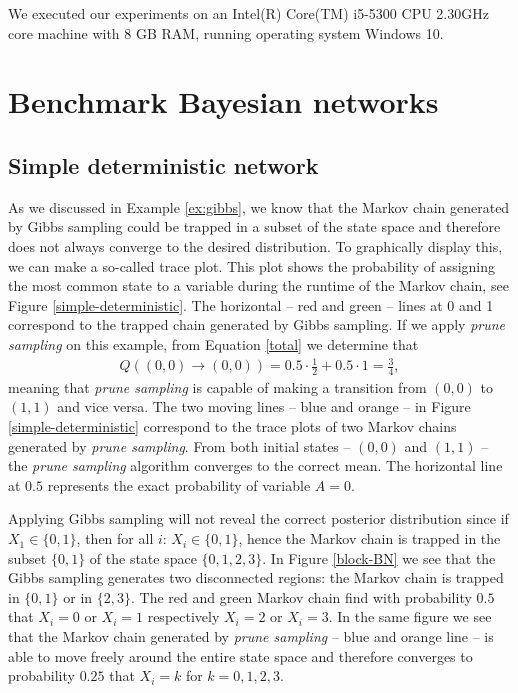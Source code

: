 \documentclass[a4paper, twoside, 11pt]{report}
\theoremstyle{plain}
\theoremstyle{definition}
\theoremstyle{remark}
\begin{document}
\indent We executed our experiments on an Intel(R) Core(TM) i5-5300 CPU \@ 2.30GHz core machine with 8 GB RAM, running operating system Windows 10. 

\section{Benchmark Bayesian networks}

\subsection{Simple deterministic network}
As we discussed in Example \ref{ex:gibbs}, we know that the Markov chain generated by Gibbs sampling could be trapped in a subset of the state space and therefore does not always converge to the desired distribution. To graphically display this, we can make a so-called trace plot. This plot shows the probability of assigning the most common state to a variable during the runtime of the Markov chain, see Figure \ref{simple-deterministic}. The horizontal -- red and green -- lines at 0 and 1 correspond to the trapped chain generated by Gibbs sampling. If we apply \textit{prune sampling} on this example, from Equation \ref{total} we determine that
\begin{align*}
Q((0,0) \to (0,0)) = 0.5 \cdot \frac{1}{2} + 0.5 \cdot 1 = \frac{3}{4},
\end{align*}
meaning that \textit{prune sampling} is capable of making a transition from $(0,0)$ to $(1,1)$ and vice versa. The two moving lines -- blue and orange -- in Figure \ref{simple-deterministic} correspond to the trace plots of two Markov chains generated by \textit{prune sampling}. From both initial states -- $(0,0)$ and $(1,1)$ -- the \textit{prune sampling} algorithm converges to the correct mean. The horizontal line at $0.5$ represents the exact probability of variable $A=0$. 

Applying Gibbs sampling will not reveal the correct posterior distribution since if $X_1 \in \{0, 1\}$, then for all $i$: $X_i \in \{0, 1\}$, hence the Markov chain is trapped in the subset $\{0,1\}$ of the state space $\{0,1,2,3\}$. In Figure \ref{block-BN} we see that the Gibbs sampling generates two disconnected regions: the Markov chain is trapped in $\{0, 1\}$ or in $\{2,3\}$. The red and green Markov chain find with probability $0.5$ that $X_i = 0$ or $X_i = 1$ respectively $X_i = 2$ or $X_i = 3$. In the same figure we see that the Markov chain generated by \textit{prune sampling} -- blue and orange line -- is able to move freely around the entire state space and therefore converges to probability $0.25$ that $X_i = k$ for $k = 0, 1, 2, 3$.
\end{document}
